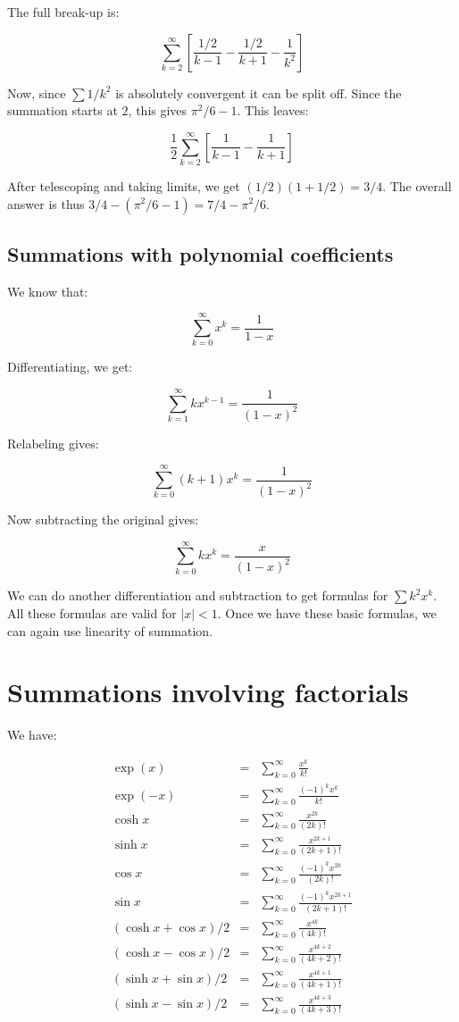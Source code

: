 \documentclass{amsart}
\begin{document}
The full break-up is:

$$\sum_{k=2}^\infty \left[\frac{1/2}{k - 1} - \frac{1/2}{k + 1} - \frac{1}{k^2}\right]$$

Now, since $\sum 1/k^2$ is absolutely convergent it can be split
off. Since the summation starts at $2$, this gives $\pi^2/6 - 1$. This leaves:

$$\frac{1}{2} \sum_{k=2}^\infty \left[ \frac{1}{k -1} - \frac{1}{k + 1} \right]$$

After telescoping and taking limits, we get $(1/2)(1 + 1/2) =
3/4$. The overall answer is thus $3/4 - (\pi^2/6 - 1) = 7/4 - \pi^2/6$. 

\subsection{Summations with polynomial coefficients}

We know that:

$$\sum_{k=0}^\infty x^k = \frac{1}{1 - x}$$

Differentiating, we get:

$$\sum_{k=1}^\infty kx^{k-1} = \frac{1}{(1 - x)^2}$$

Relabeling gives:

$$\sum_{k=0}^\infty (k + 1)x^k =  \frac{1}{(1 - x)^2}$$

Now subtracting the original gives:

$$\sum_{k=0}^\infty kx^k = \frac{x}{(1 - x)^2}$$

We can do another differentiation and subtraction to get formulas for
$\sum k^2x^k$. All these formulas are valid for $|x| < 1$. Once we
have these basic formulas, we can again use linearity of summation.

\section{Summations involving factorials}

We have:

\begin{eqnarray*}
  \exp(x) & = & \sum_{k=0}^\infty \frac{x^k}{k!}\\
  \exp(-x) & = & \sum_{k=0}^\infty \frac{(-1)^kx^k}{k!}\\
  \cosh x & = & \sum_{k=0}^\infty \frac{x^{2k}}{(2k)!}\\
  \sinh x & = & \sum_{k=0}^\infty \frac{x^{2k + 1}}{(2k + 1)!}\\
  \cos x & = & \sum_{k=0}^\infty \frac{(-1)^kx^{2k}}{(2k)!}\\
  \sin x & = & \sum_{k=0}^\infty \frac{(-1)^kx^{2k + 1}}{(2k + 1)!}\\
  (\cosh x + \cos x)/2 & = & \sum_{k=0}^\infty \frac{x^{4k}}{(4k)!}\\
  (\cosh x - \cos x)/2 & = & \sum_{k=0}^\infty \frac{x^{4k + 2}}{(4k + 2)!}\\
  (\sinh x + \sin x)/2 & = & \sum_{k=0}^\infty \frac{x^{4k + 1}}{(4k + 1)!}\\
  (\sinh x - \sin x)/2 & = & \sum_{k=0}^\infty \frac{x^{4k + 3}}{(4k + 3)!}
\end{eqnarray*}
\end{document}
